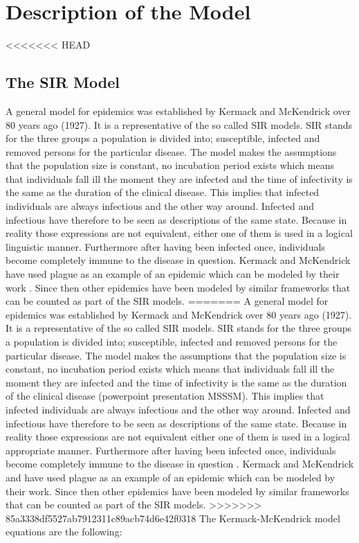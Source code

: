 \documentclass[11pt]{article}
\begin{document}
\section{Description of the Model}
<<<<<<< HEAD
\subsection{The SIR Model}
A general model for epidemics was established by Kermack and McKendrick over 80 years ago (1927). It is a representative of the so called SIR models. SIR stands for the three groups a population is divided into; susceptible, infected and removed persons for the particular disease. The model makes the assumptions that the population size is constant, no incubation period exists which means that individuals fall ill the moment they are infected and the time of infectivity is the same as the duration of the clinical disease. This implies that infected individuals are always infectious and the other way around. Infected and infectious have therefore to be seen as descriptions of the same state. Because in reality those expressions are not equivalent, either one of them is used in a logical linguistic manner. Furthermore after having been infected once, individuals become completely immune to the disease in question. Kermack and McKendrick have used plague as an example of an epidemic which can be modeled by their work \cite{kermack:1927}. Since then other epidemics have been modeled by similar frameworks that can be counted as part of the SIR models.
=======
A general model for epidemics was established by Kermack and McKendrick over 80 years ago (1927). It is a representative of the so called SIR models. SIR stands for the three groups a population is divided into; susceptible, infected and removed persons for the particular disease. The model makes the assumptions that the population size is constant, no incubation period exists which means that individuals fall ill the moment they are infected and the time of infectivity is the same as the duration of the clinical disease (powerpoint presentation MSSSM). This implies that infected individuals are always infectious and the other way around. Infected and infectious have therefore to be seen as descriptions of the same state. Because in reality those expressions are not equivalent either one of them is used in a logical appropriate manner. Furthermore after having been infected once, individuals become completely immune to the disease in question \cite{kermack:1927}. Kermack and McKendrick and have used plague as an example of an epidemic which can be modeled by their work. Since then other epidemics have been modeled by similar frameworks that can be counted as part of the SIR models.
>>>>>>> 85a3338df5527ab7912311c89acb74d6e42f0318
The Kermack-McKendrick model equations are the following:
\end{document}
